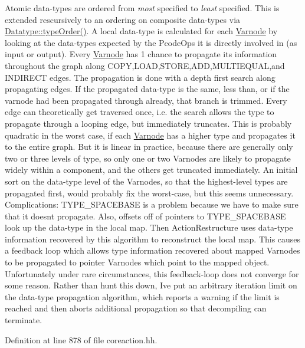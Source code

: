 Atomic data-\/types are ordered from {\itshape most} specified to {\itshape least} specified. This is extended rescursively to an ordering on composite data-\/types via \mbox{\hyperlink{class_datatype_a97e8ffb05266d744b2a63d20a76a9974}{Datatype\+::type\+Order()}}. A local data-\/type is calculated for each \mbox{\hyperlink{class_varnode}{Varnode}} by looking at the data-\/types expected by the Pcode\+Ops it is directly involved in (as input or output). Every \mbox{\hyperlink{class_varnode}{Varnode}} has 1 chance to propagate its information throughout the graph along C\+O\+PY,L\+O\+AD,S\+T\+O\+RE,A\+DD,M\+U\+L\+T\+I\+E\+Q\+U\+AL,and I\+N\+D\+I\+R\+E\+CT edges. The propagation is done with a depth first search along propagating edges. If the propagated data-\/type is the same, less than, or if the varnode had been propagated through already, that branch is trimmed. Every edge can theoretically get traversed once, i.\+e. the search allows the type to propagate through a looping edge, but immediately truncates. This is probably quadratic in the worst case, if each \mbox{\hyperlink{class_varnode}{Varnode}} has a higher type and propagates it to the entire graph. But it is linear in practice, because there are generally only two or three levels of type, so only one or two Varnodes are likely to propagate widely within a component, and the others get truncated immediately. An initial sort on the data-\/type level of the Varnodes, so that the highest-\/level types are propagated first, would probably fix the worst-\/case, but this seems unnecessary. Complications\+: T\+Y\+P\+E\+\_\+\+S\+P\+A\+C\+E\+B\+A\+SE is a problem because we have to make sure that it doesn\textquotesingle{}t propagate. Also, offsets off of pointers to T\+Y\+P\+E\+\_\+\+S\+P\+A\+C\+E\+B\+A\+SE look up the data-\/type in the local map. Then Action\+Restructure uses data-\/type information recovered by this algorithm to reconstruct the local map. This causes a feedback loop which allows type information recovered about mapped Varnodes to be propagated to pointer Varnodes which point to the mapped object. Unfortunately under rare circumstances, this feedback-\/loop does not converge for some reason. Rather than hunt this down, I\textquotesingle{}ve put an arbitrary iteration limit on the data-\/type propagation algorithm, which reports a warning if the limit is reached and then aborts additional propagation so that decompiling can terminate. 

Definition at line 878 of file coreaction.\+hh.



